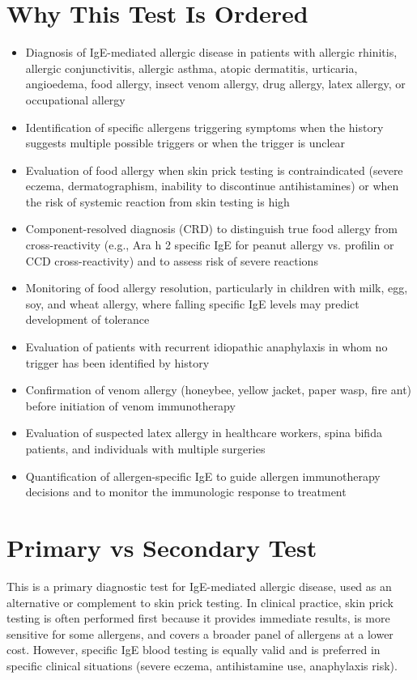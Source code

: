 \section*{Why This Test Is Ordered}
\begin{itemize}
  \item Diagnosis of IgE-mediated allergic disease in patients with allergic rhinitis, allergic conjunctivitis, allergic asthma, atopic dermatitis, urticaria, angioedema, food allergy, insect venom allergy, drug allergy, latex allergy, or occupational allergy
  \item Identification of specific allergens triggering symptoms when the history suggests multiple possible triggers or when the trigger is unclear
  \item Evaluation of food allergy when skin prick testing is contraindicated (severe eczema, dermatographism, inability to discontinue antihistamines) or when the risk of systemic reaction from skin testing is high
  \item Component-resolved diagnosis (CRD) to distinguish true food allergy from cross-reactivity (e.g., Ara h 2 specific IgE for peanut allergy vs. profilin or CCD cross-reactivity) and to assess risk of severe reactions
  \item Monitoring of food allergy resolution, particularly in children with milk, egg, soy, and wheat allergy, where falling specific IgE levels may predict development of tolerance
  \item Evaluation of patients with recurrent idiopathic anaphylaxis in whom no trigger has been identified by history
  \item Confirmation of venom allergy (honeybee, yellow jacket, paper wasp, fire ant) before initiation of venom immunotherapy
  \item Evaluation of suspected latex allergy in healthcare workers, spina bifida patients, and individuals with multiple surgeries
  \item Quantification of allergen-specific IgE to guide allergen immunotherapy decisions and to monitor the immunologic response to treatment
\end{itemize}

\section*{Primary vs Secondary Test}
This is a primary diagnostic test for IgE-mediated allergic disease, used as an alternative or complement to skin prick testing. In clinical practice, skin prick testing is often performed first because it provides immediate results, is more sensitive for some allergens, and covers a broader panel of allergens at a lower cost. However, specific IgE blood testing is equally valid and is preferred in specific clinical situations (severe eczema, antihistamine use, anaphylaxis risk).

